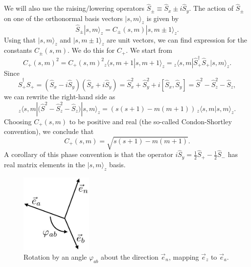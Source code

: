 We will also use the raising/lowering operators $\hat{S}_{\pm} \equiv \hat{S}_x\pm i \hat{S}_y$. The action of $\hat{S}_{\pm}$ on one of the orthonormal basis vectors $|s,m\rangle_z$ is given by
\begin{equation}
\hat{S}_\pm |s,m\rangle_z = C_\pm(s,m)|s,m \pm1\rangle_z.
\label{raising operator}
\end{equation}
Using that $|s,m\rangle_z$ and $|s,m\pm1\rangle_z$ are unit vectors, we can find expression for the constants $C_\pm(s,m)$. We do this for $C_+$. We start from
\begin{equation}
C_+(s,m)^2 = C_+(s,m)^2 {_z}\langle s,m+1|s,m+1\rangle_z = {_z\!}\langle s,m|\hat{S}_+^\dagger \hat{S}_+|s,m\rangle_{\!z}.
\label{raising norm 1}
\end{equation}
Since
\begin{equation}
\hat{S}_+^\dagger \hat{S}_+ = (\hat{S}_x-i \hat{S}_y)(\hat{S}_x+i \hat{S}_y) = \hat{S}_x^2+\hat{S}_y^2 +i[\hat{S}_x,\hat{S}_y]=\hat{S}^2 - \hat{S}_z^2-\hat{S}_z,
\label{raising}
\end{equation}
we can rewrite the right-hand side as
\begin{equation}
{_z\!}\langle s,m|\big(\hat{S}^2-\hat{S}_z^2-\hat{S}_z\big)|s,m\rangle_{\!z} = (s(s+1)-m(m+1)) \, {_z\!}\langle s,m|s,m\rangle_{\!z}.
\label{raising norm 2}
\end{equation}
Choosing $C_+(s,m)$ to be positive and real (the so-called Condon-Shortley convention), we conclude that
\begin{equation}
C_+(s,m)=\sqrt{s(s+1)-m(m+1)}.
\label{coef raising}
\end{equation}
A corollary of this phase convention is that the operator $i\hat{S}_y = \frac12 \hat{S}_{+}-\frac12 \hat{S}_-$ has real matrix elements in the $|s,m\rangle_{\!z}$ basis.

\begin{figure}[h]
 \centering
   \includegraphics[width=1.4in]{rotation.jpeg} 
   \caption{Rotation by an angle $\varphi_{ab}$ about the direction $\vec{e}_n$, mapping $\vec{e}_z$ to $\vec{e}_a$.}
   \label{rotation}
\end{figure}


